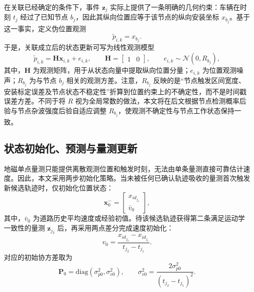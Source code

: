 \documentclass{xdupgthesis}
\begin{document}
在关联已经确定的条件下，事件 $\mathbf z_j$ 实际上提供了一条明确的几何约束：车辆在时刻 $t_j$ 经过了已知节点 $b_j$，因此其纵向位置应等于该节点的纵向安装坐标 $x_{b_j}$。基于这一事实，定义伪位置观测
\begin{equation}
	\tilde p_{i,k}=x_{b_j}.
	\label{eq:ch3_pseudo_meas}
\end{equation}
于是，关联成立后的状态更新可写为线性观测模型
\begin{equation}
	\tilde p_{i,k}
	=
	\mathbf H\mathbf x_{i,k}
	+
	e_{i,k},
	\qquad
	\mathbf H=
	\begin{bmatrix}
		1 & 0
	\end{bmatrix},
	\qquad
	e_{i,k}\sim\mathcal N(0,R_{b_j}),
	\label{eq:ch3_measurement_k}
\end{equation}
其中，$\mathbf H$ 为观测矩阵，用于从状态向量中提取纵向位置分量；$e_{i,k}$ 为位置观测噪声；$R_{b_j}$ 为与节点 $b_j$ 相关的观测方差。注意，$R_{b_j}$ 反映的是“节点触发区间宽度、安装标定误差及节点状态不稳定性”折算到位置约束上的不确定性，而不是时间戳误差方差。不同于将 $R$ 视为全局常数的做法，本文将在后文根据节点检测概率后验与节点杂波强度后验自适应调整 $R_{b_j}$，使观测不确定性与节点工作状态保持一致。

\subsection{状态初始化、预测与量测更新}

地磁单点量测只能提供离散观测位置和触发时刻，无法由单条量测直接可靠估计速度。因此，本文采用两步初始化策略。当未被任何已确认轨迹吸收的量测首次触发新候选轨迹时，仅初始化位置状态：
\begin{equation}
	\mathbf x_0^-=
	\begin{bmatrix}
		x_{id_{j_1}}\\
		\bar v_0
	\end{bmatrix},
	\label{eq:ch3_init_state_v2}
\end{equation}
其中，$\bar v_0$ 为道路历史平均速度或经验初值。待该候选轨迹获得第二条满足运动学一致性的量测 $\mathbf z_{j_2}$ 后，再采用两点差分完成速度初始化：
\begin{equation}
	v_0=
	\frac{x_{id_{j_2}}-x_{id_{j_1}}}{t_{j_2}-t_{j_1}}.
	\label{eq:ch3_init_velocity_v2}
\end{equation}
对应的初始协方差取为
\begin{equation}
	\mathbf P_0=\mathrm{diag}(\sigma_{p0}^2,\sigma_{v0}^2),
	\qquad
	\sigma_{v0}^2=\frac{2\sigma_{p0}^2}{(t_{j_2}-t_{j_1})^2}.
	\label{eq:ch3_P0_v2}
\end{equation}
\end{document}
